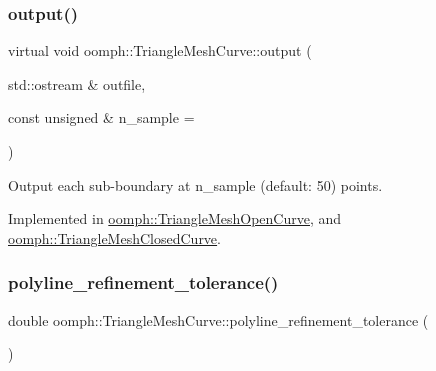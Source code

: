 \mbox{\label{classoomph_1_1TriangleMeshCurve_a7d40afc7e879fde0319b153a141915df}} 
\subsubsection{\texorpdfstring{output()}{output()}}
{\footnotesize\ttfamily virtual void oomph\+::\+Triangle\+Mesh\+Curve\+::output (\begin{DoxyParamCaption}\item[{std\+::ostream \&}]{outfile,  }\item[{const unsigned \&}]{n\+\_\+sample = {} }\end{DoxyParamCaption})\hspace{0.3cm}{\ttfamily [pure virtual]}}



Output each sub-\/boundary at n\+\_\+sample (default\+: 50) points. 



Implemented in \hyperlink{classoomph_1_1TriangleMeshOpenCurve_adfffbe10445328b0b021b82443ff8458}{oomph\+::\+Triangle\+Mesh\+Open\+Curve}, and \hyperlink{classoomph_1_1TriangleMeshClosedCurve_a246d71ca0cb2dbc9d2c9ad6976f84ba6}{oomph\+::\+Triangle\+Mesh\+Closed\+Curve}.

\mbox{\label{classoomph_1_1TriangleMeshCurve_acca896e38e84ed0f7431f21572880781}} 
\subsubsection{\texorpdfstring{polyline\+\_\+refinement\+\_\+tolerance()}{polyline\_refinement\_tolerance()}}
{\footnotesize\ttfamily double oomph\+::\+Triangle\+Mesh\+Curve\+::polyline\+\_\+refinement\+\_\+tolerance (\begin{DoxyParamCaption}{ }\end{DoxyParamCaption})\hspace{0.3cm}{\ttfamily [inline]}}



